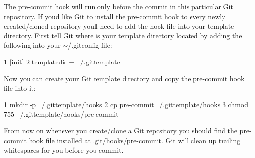 The pre-\/commit hook will run only before the commit in this particular Git repository. If you\textquotesingle{}d like Git to install the pre-\/commit hook to every newly created/cloned repository you\textquotesingle{}ll need to add the hook file into your template directory. First tell Git where is your template directory located by adding the following into your {\ttfamily $\sim$/.gitconfig} file\+:


\begin{DoxyCode}
1 [init]
2         templatedir = ~/.gittemplate
\end{DoxyCode}


Now you can create your Git template directory and copy the {\ttfamily pre-\/commit} hook file into it\+:


\begin{DoxyCode}
1 mkdir -p ~/.gittemplate/hooks
2 cp pre-commit ~/.gittemplate/hooks
3 chmod 755 ~/.gittemplate/hooks/pre-commit
\end{DoxyCode}


From now on whenever you create/clone a Git repository you should find the {\ttfamily pre-\/commit} hook file installed at {\ttfamily .git/hooks/pre-\/commit}. Git will clean up trailing whitespaces for you before you commit. 